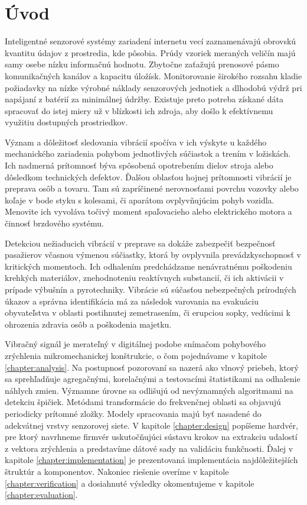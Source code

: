 \chapter{Úvod}
Inteligentné senzorové systémy zariadení internetu vecí zaznamenávajú obrovskú kvantitu údajov z prostredia, kde
pôsobia. Prúdy vzoriek meraných veličín majú samy osebe nízku informačnú hodnotu. Zbytočne zaťažujú
prenosové pásmo komunikačných kanálov a kapacitu úložísk. Monitorovanie širokého rozsahu kladie požiadavky
na nízke výrobné náklady senzorových jednotiek a dlhodobú výdrž pri napájaní z batérií za minimálnej údržby.
Existuje preto potreba získané dáta spracovať do istej miery už v blízkosti ich zdroja, aby došlo k efektívnemu
využitiu dostupných prostriedkov.

Význam a dôležitosť sledovania vibrácií spočíva v ich výskyte u každého mechanického zariadenia pohybom jednotlivých súčiastok
a trením v ložiskách. Ich nadmerná prítomnosť býva spôsobená opotrebením dielov stroja alebo dôsledkom technických defektov.
Ďalšou oblasťou hojnej prítomnosti vibrácií je preprava osôb a tovaru. Tam sú zapríčinené nerovnosťami povrchu vozovky
alebo koľaje v bode styku s kolesami, či aparátom ovplyvňujúcim pohyb vozidla. Menovite ich vyvoláva točivý moment
spaľovacieho alebo elektrického motora a činnosť brzdového systému.

Detekciou nežiaducich vibrácií v preprave sa dokáže zabezpečiť bezpečnosť pasažierov včasnou výmenou súčiastky,
ktorá by ovplyvnila prevádzkyschopnosť v kritických momentoch. Ich odhalením predchádzame nenávratnému poškodeniu krehkých materiálov,
znehodnoteniu reaktívnych substancií, či ich aktivácii v prípade výbušnín a pyrotechniky. Vibrácie sú súčasťou
nebezpečných prírodných úkazov a správna identifikácia má za následok varovania na evakuáciu obyvateľstva
v oblasti postihnutej zemetrasením, či erupciou sopky, vedúcimi k ohrozenia zdravia osôb a poškodenia majetku.

Vibračný signál je merateľný v digitálnej podobe snímačom pohybového zrýchlenia mikromechanickej konštrukcie, o čom
pojednávame v kapitole \ref{chapter:analysis}. Na postupnosť pozorovaní sa nazerá ako vlnový priebeh,
ktorý sa sprehľadňuje agregačnými, korelačnými a testovacími štatistikami na odhalenie náhlych zmien.
Významne úrovne sa odlišujú od nevýznamných algoritmami na detekciu špičiek. Metódami transformácie do frekvenčnej oblasti
sa objavujú periodicky prítomné zložky. Modely spracovania majú byť nasadené do adekvátnej vrstvy senzorovej siete.
V kapitole \ref{chapter:design} popíšeme hardvér, pre ktorý navrhneme firmvér uskutočňujúci sústavu
krokov na extrakciu udalostí z vektora zrýchlenia a predstavíme dátové sady na validáciu funkčnosti.
Ďalej v kapitole \ref{chapter:implementation} je prezentovaná implementácia najdôležitejších štruktúr a komponentov. Nakoniec
riešenie overíme v kapitole \ref{chapter:verification} a dosiahnuté výsledky okomentujeme v kapitole \ref{chapter:evaluation}.


